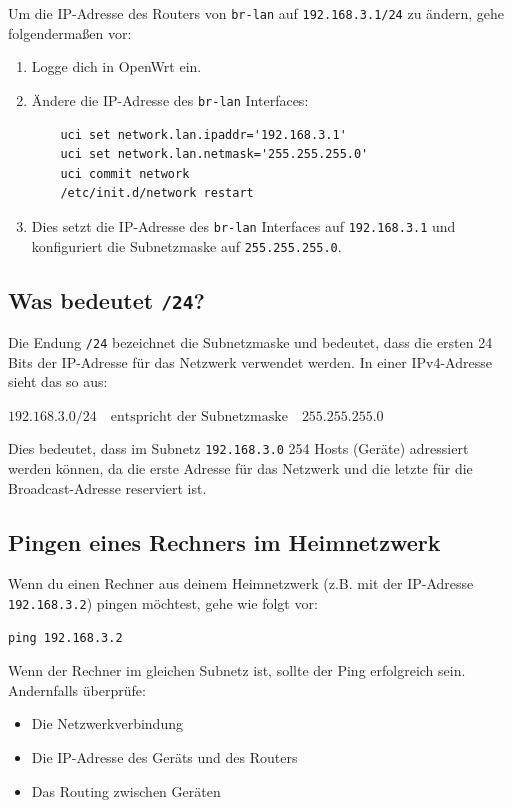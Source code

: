 \documentclass[12pt, a4paper]{article}\usepackage{listings}
\begin{document}
Um die IP-Adresse des Routers von \texttt{br-lan} auf \texttt{192.168.3.1/24} zu ändern, gehe folgendermaßen vor:

\begin{enumerate}
    \item Logge dich in OpenWrt ein.
    \item Ändere die IP-Adresse des \texttt{br-lan} Interfaces:
    \begin{verbatim}
    uci set network.lan.ipaddr='192.168.3.1'
    uci set network.lan.netmask='255.255.255.0'
    uci commit network
    /etc/init.d/network restart
    \end{verbatim}
    \item Dies setzt die IP-Adresse des \texttt{br-lan} Interfaces auf \texttt{192.168.3.1} und konfiguriert die Subnetzmaske auf \texttt{255.255.255.0}.
\end{enumerate}

\subsection{Was bedeutet \texttt{/24}?}

Die Endung \texttt{/24} bezeichnet die Subnetzmaske und bedeutet, dass die ersten 24 Bits der IP-Adresse für das Netzwerk verwendet werden. In einer IPv4-Adresse sieht das so aus:

$
192.168.3.0/24 \quad \text{entspricht der Subnetzmaske} \quad 255.255.255.0
$

Dies bedeutet, dass im Subnetz \texttt{192.168.3.0} 254 Hosts (Geräte) adressiert werden können, da die erste Adresse für das Netzwerk und die letzte für die Broadcast-Adresse reserviert ist.

\subsection{Pingen eines Rechners im Heimnetzwerk}

Wenn du einen Rechner aus deinem Heimnetzwerk (z.B. mit der IP-Adresse \texttt{192.168.3.2}) pingen möchtest, gehe wie folgt vor:

\begin{verbatim}
ping 192.168.3.2
\end{verbatim}

Wenn der Rechner im gleichen Subnetz ist, sollte der Ping erfolgreich sein. Andernfalls überprüfe:
\begin{itemize}
    \item Die Netzwerkverbindung
    \item Die IP-Adresse des Geräts und des Routers
    \item Das Routing zwischen Geräten
\end{itemize}
\end{document}

